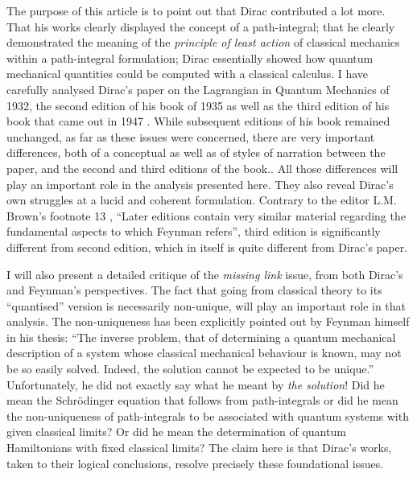 \documentclass[12pt]{article}
\begin{document}
The purpose of this article is to point out that Dirac contributed a lot more. That his works clearly displayed the concept of a path-integral;
that he clearly demonstrated the meaning of the {\it principle of least action} of classical mechanics within a path-integral formulation; Dirac
essentially showed how quantum mechanical quantities could be computed with a classical calculus. I have carefully analysed Dirac's paper on the
Lagrangian in Quantum Mechanics of 1932, the second edition of his book of 1935 \cite{diracbook2} as well as the third edition of his book that came 
out in 1947 \cite{diracbook3}.
While subsequent editions of his book remained unchanged, as far as these issues were concerned, there are very important differences, both
of a conceptual as well as of styles of narration between the paper, and the second and third editions of the book.. All those differences will play an important role in the analysis presented here. They
also reveal Dirac's own struggles at a lucid and coherent formulation. Contrary to the editor L.M. Brown's footnote 13 \cite{thesis},
``Later editions contain very similar material regarding the
fundamental aspects to which Feynman refers'', third edition is significantly different from second edition, which in itself is quite different
from Dirac's paper.

I will also present a detailed critique of the {\it missing link} issue, from both Dirac's and Feynman's perspectives. The fact that going 
from classical theory to its ``quantised'' version is necessarily non-unique, will play an important role in that analysis. The non-uniqueness
 has been explicitly pointed out by Feynman himself in his thesis: 
``The inverse problem, that of determining a quantum mechanical
description of a system whose classical mechanical behaviour is
known, may not be so easily solved. Indeed, the solution cannot be
expected to be unique.'' Unfortunately, he did not exactly say what he meant by \emph{the solution}! Did he mean the Schr\"odinger equation
that follows from path-integrals or did he mean the non-uniqueness of path-integrals to be associated with quantum systems with given
classical limits? Or did he mean the determination of quantum Hamiltonians with fixed classical limits? The claim here is that Dirac's
works, taken to their logical conclusions, resolve precisely these foundational issues.
\end{document}
